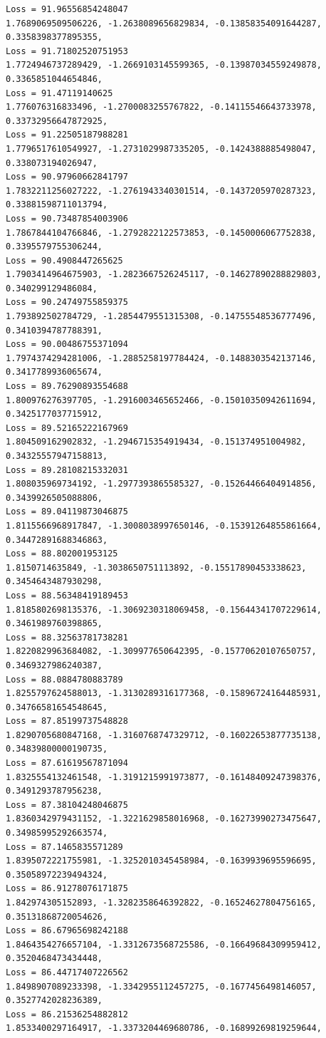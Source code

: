 \documentclass[11pt]{article}
\begin{document}
\begin{Verbatim}[commandchars=\\\{\}]
Loss = 91.96556854248047
1.7689069509506226, -1.2638089656829834, -0.13858354091644287,
0.3358398377895355,
Loss = 91.71802520751953
1.7724946737289429, -1.2669103145599365, -0.13987034559249878,
0.3365851044654846,
Loss = 91.47119140625
1.776076316833496, -1.2700083255767822, -0.14115546643733978,
0.33732956647872925,
Loss = 91.22505187988281
1.7796517610549927, -1.2731029987335205, -0.1424388885498047, 0.338073194026947,
Loss = 90.97960662841797
1.7832211256027222, -1.2761943340301514, -0.1437205970287323,
0.33881598711013794,
Loss = 90.73487854003906
1.7867844104766846, -1.2792822122573853, -0.1450006067752838,
0.3395579755306244,
Loss = 90.4908447265625
1.7903414964675903, -1.2823667526245117, -0.14627890288829803,
0.340299129486084,
Loss = 90.24749755859375
1.793892502784729, -1.2854479551315308, -0.14755548536777496,
0.3410394787788391,
Loss = 90.00486755371094
1.7974374294281006, -1.2885258197784424, -0.1488303542137146,
0.3417789936065674,
Loss = 89.76290893554688
1.800976276397705, -1.2916003465652466, -0.15010350942611694,
0.3425177037715912,
Loss = 89.52165222167969
1.804509162902832, -1.2946715354919434, -0.151374951004982, 0.34325557947158813,
Loss = 89.28108215332031
1.808035969734192, -1.2977393865585327, -0.15264466404914856,
0.3439926505088806,
Loss = 89.04119873046875
1.8115566968917847, -1.3008038997650146, -0.15391264855861664,
0.34472891688346863,
Loss = 88.802001953125
1.8150714635849, -1.3038650751113892, -0.15517890453338623, 0.3454643487930298,
Loss = 88.56348419189453
1.8185802698135376, -1.3069230318069458, -0.15644341707229614,
0.3461989760398865,
Loss = 88.32563781738281
1.8220829963684082, -1.309977650642395, -0.15770620107650757,
0.3469327986240387,
Loss = 88.0884780883789
1.8255797624588013, -1.3130289316177368, -0.15896724164485931,
0.34766581654548645,
Loss = 87.85199737548828
1.8290705680847168, -1.3160768747329712, -0.16022653877735138,
0.34839800000190735,
Loss = 87.61619567871094
1.8325554132461548, -1.3191215991973877, -0.16148409247398376,
0.3491293787956238,
Loss = 87.38104248046875
1.8360342979431152, -1.3221629858016968, -0.16273990273475647,
0.34985995292663574,
Loss = 87.1465835571289
1.8395072221755981, -1.3252010345458984, -0.1639939695596695,
0.35058972239494324,
Loss = 86.91278076171875
1.842974305152893, -1.3282358646392822, -0.16524627804756165,
0.35131868720054626,
Loss = 86.67965698242188
1.8464354276657104, -1.3312673568725586, -0.16649684309959412,
0.3520468473434448,
Loss = 86.44717407226562
1.8498907089233398, -1.3342955112457275, -0.1677456498146057,
0.3527742028236389,
Loss = 86.21536254882812
1.8533400297164917, -1.3373204469680786, -0.16899269819259644,

\end{Verbatim}
\end{document}
